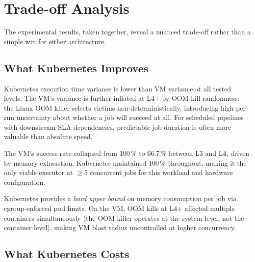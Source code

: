 
\section{Trade-off Analysis}
\label{sec:tradeoff}

The experimental results, taken together, reveal a nuanced trade-off rather than a simple win for either architecture.

\subsection{What Kubernetes Improves}
\label{subsec:k8s-improves}

\begin{description}[style=nextline]
  \item[Execution time variance.]
  Kubernetes execution time variance is lower than VM variance at all tested levels.
  The VM's variance is further inflated at L4+ by OOM-kill randomness: the Linux OOM killer selects victims non-deterministically, introducing high per-run uncertainty about whether a job will succeed at all.
  For scheduled pipelines with downstream SLA dependencies, predictable job duration is often more valuable than absolute speed.

  \item[Reliability at moderate concurrency.]
  The VM's success rate collapsed from 100\,\% to 66.7\,\% between L3 and L4, driven by memory exhaustion.
  Kubernetes maintained 100\,\% throughout, making it the only viable executor at $\geq$5 concurrent jobs for this workload and hardware configuration.

  \item[Blast radius containment at scale.]
  Kubernetes provides a \emph{hard upper bound} on memory consumption per job via cgroup-enforced pod limits.
  On the VM, OOM kills at L4+ affected multiple containers simultaneously (the OOM killer operates at the system level, not the container level), making VM blast radius uncontrolled at higher concurrency.
\end{description}

\subsection{What Kubernetes Costs}
\label{subsec:k8s-costs}

